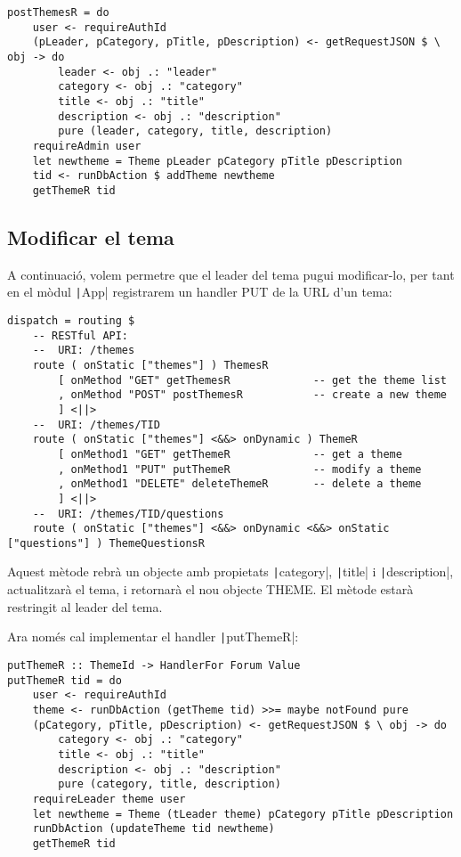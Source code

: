 \documentclass[catalan, a4paper]{scrartcl}
\begin{document}
\begin{verbatim}
postThemesR = do
    user <- requireAuthId
    (pLeader, pCategory, pTitle, pDescription) <- getRequestJSON $ \ obj -> do
        leader <- obj .: "leader"
        category <- obj .: "category"
        title <- obj .: "title"
        description <- obj .: "description"
        pure (leader, category, title, description)
    requireAdmin user
    let newtheme = Theme pLeader pCategory pTitle pDescription
    tid <- runDbAction $ addTheme newtheme
    getThemeR tid
\end{verbatim}

\subsection*{Modificar el tema}

A continuació, volem permetre que el leader del tema pugui modificar-lo,
per tant en el mòdul \texttt|App| registrarem un handler
\textsf{PUT} de la URL d'un tema:

\begin{verbatim}
dispatch = routing $
    -- RESTful API:
    --  URI: /themes
    route ( onStatic ["themes"] ) ThemesR
        [ onMethod "GET" getThemesR             -- get the theme list
        , onMethod "POST" postThemesR           -- create a new theme
        ] <||>
    --  URI: /themes/TID
    route ( onStatic ["themes"] <&&> onDynamic ) ThemeR
        [ onMethod1 "GET" getThemeR             -- get a theme
        , onMethod1 "PUT" putThemeR             -- modify a theme
        , onMethod1 "DELETE" deleteThemeR       -- delete a theme
        ] <||>
    --  URI: /themes/TID/questions
    route ( onStatic ["themes"] <&&> onDynamic <&&> onStatic ["questions"] ) ThemeQuestionsR
\end{verbatim}

Aquest mètode rebrà un objecte amb propietats \texttt|category|,
\texttt|title| i  \texttt|description|, actualitzarà
el tema, i retornarà el nou objecte \textsf{THEME}. El mètode estarà
restringit al leader del tema.

Ara només cal implementar el handler \texttt|putThemeR|:

\begin{verbatim}
putThemeR :: ThemeId -> HandlerFor Forum Value
putThemeR tid = do
    user <- requireAuthId
    theme <- runDbAction (getTheme tid) >>= maybe notFound pure
    (pCategory, pTitle, pDescription) <- getRequestJSON $ \ obj -> do
        category <- obj .: "category"
        title <- obj .: "title"
        description <- obj .: "description"
        pure (category, title, description)
    requireLeader theme user
    let newtheme = Theme (tLeader theme) pCategory pTitle pDescription
    runDbAction (updateTheme tid newtheme)
    getThemeR tid
\end{verbatim}
\end{document}
